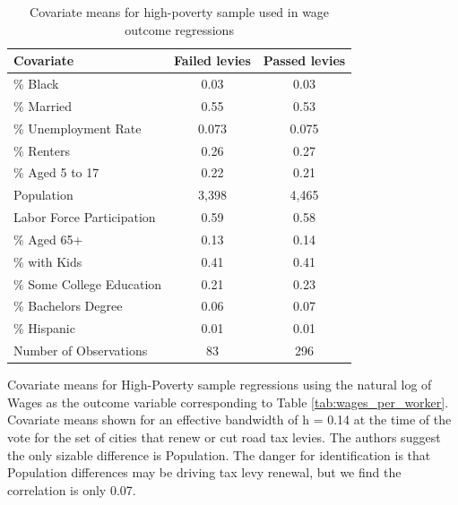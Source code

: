 \begin{table}[!h]
    \centering
    \caption{Covariate means for high-poverty sample used in wage outcome regressions}
    \label{tab:covariate_means_wage}
    \begin{tabular}{p{4cm}cc}
        \hline
        Covariate & Failed levies & Passed levies \\
        \hline
        \% Black                & 0.03  & 0.03  \\
        \% Married              & 0.55  & 0.53  \\
        \% Unemployment Rate    & 0.073 & 0.075 \\
        \% Renters              & 0.26  & 0.27  \\
        \% Aged 5 to 17         & 0.22  & 0.21  \\
        Population              & 3,398 & 4,465 \\
        Labor Force Participation & 0.59  & 0.58  \\
        \% Aged 65+             & 0.13  & 0.14  \\
        \% with Kids            & 0.41  & 0.41  \\
        \% Some College Education & 0.21  & 0.23  \\
        \% Bachelors Degree     & 0.06  & 0.07  \\
        \% Hispanic             & 0.01  & 0.01  \\
        Number of Observations  & 83    & 296   \\
        \hline
    \end{tabular}
    \begin{tablenotes}
        \small
        \item Covariate means for High-Poverty sample regressions using the natural log of Wages as the outcome variable corresponding to Table \ref{tab:wages_per_worker}. Covariate means shown for an effective bandwidth of h = 0.14 at the time of the vote for the set of cities that renew or cut road tax levies. The authors suggest the only sizable difference is Population. The danger for identification is that Population differences may be driving tax levy renewal, but we find the correlation is only 0.07.
    \end{tablenotes}
\end{table}

\clearpage


